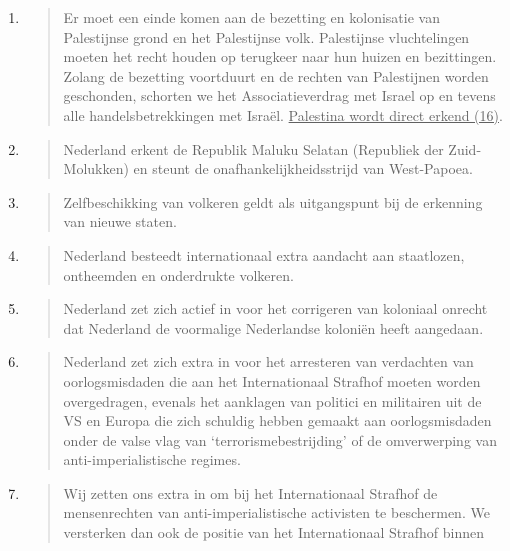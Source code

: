 \begin{enumerate}
\def\labelenumi{\arabic{enumi}.}
\item
  \begin{quote}
  Er moet een einde komen aan de bezetting en kolonisatie van
  Palestijnse grond en het Palestijnse volk. Palestijnse vluchtelingen
  moeten het recht houden op terugkeer naar hun huizen en bezittingen.
  Zolang de bezetting voortduurt en de rechten van Palestijnen worden
  geschonden, schorten we het Associatieverdrag met Israel op en tevens
  alle handelsbetrekkingen met Israël. \underline{Palestina wordt direct
  erkend (16)}.
  \end{quote}
\item
  \begin{quote}
  Nederland erkent de Republik Maluku Selatan (Republiek der
  Zuid-Molukken) en steunt de onafhankelijkheidsstrijd van West-Papoea.
  \end{quote}
\item
  \begin{quote}
  Zelfbeschikking van volkeren geldt als uitgangspunt bij de erkenning
  van nieuwe staten.
  \end{quote}
\item
  \begin{quote}
  Nederland besteedt internationaal extra aandacht aan staatlozen,
  ontheemden en onderdrukte volkeren.
  \end{quote}
\item
  \begin{quote}
  Nederland zet zich actief in voor het corrigeren van koloniaal onrecht
  dat Nederland de voormalige Nederlandse koloniën heeft aangedaan.
  \end{quote}
\item
  \begin{quote}
  Nederland zet zich extra in voor het arresteren van verdachten van
  oorlogsmisdaden die aan het Internationaal Strafhof moeten worden
  overgedragen, evenals het aanklagen van politici en militairen uit de
  VS en Europa die zich schuldig hebben gemaakt aan oorlogsmisdaden
  onder de valse vlag van `terrorismebestrijding' of de omverwerping van
  anti-imperialistische regimes.
  \end{quote}
\item
  \begin{quote}
  Wij zetten ons extra in om bij het Internationaal Strafhof de
  mensenrechten van anti-imperialistische activisten te beschermen. We
  versterken dan ook de positie van het Internationaal Strafhof binnen

\end{quote}
\end{enumerate}
